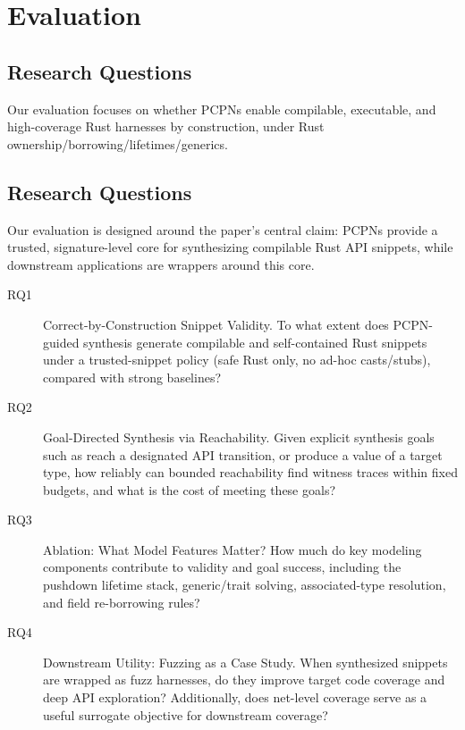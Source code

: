\documentclass[sigconf]{acmart}
\begin{document}


\section{Evaluation}
\label{sec:evaluation}

\subsection{Research Questions}
\label{sec:evaluation:rqs}
Our evaluation focuses on whether PCPNs enable compilable, executable, and high-coverage
Rust harnesses by construction, under Rust ownership/borrowing/lifetimes/generics.

\subsection{Research Questions}
\label{sec:evaluation:rqs}

Our evaluation is designed around the paper's central claim: PCPNs provide a trusted, signature-level core for synthesizing compilable Rust API snippets, while downstream applications are wrappers around this core.

\begin{description}
\item[RQ1] Correct-by-Construction Snippet Validity. To what extent does PCPN-guided synthesis generate compilable and self-contained Rust snippets under a trusted-snippet policy (safe Rust only, no ad-hoc casts/stubs), compared with strong baselines?

\item[RQ2] Goal-Directed Synthesis via Reachability. Given explicit synthesis goals such as reach a designated API transition, or produce a value of a target type, how reliably can bounded reachability find witness traces within fixed budgets, and what is the cost of meeting these goals?

\item[RQ3] Ablation: What Model Features Matter? How much do key modeling components contribute to validity and goal success, including the pushdown lifetime stack, generic/trait solving, associated-type resolution, and field re-borrowing rules?

\item[RQ4] Downstream Utility: Fuzzing as a Case Study. When synthesized snippets are wrapped as fuzz harnesses, do they improve target code coverage and deep API exploration? Additionally, does net-level coverage serve as a useful surrogate objective for downstream coverage?
\end{description}
\end{document}
